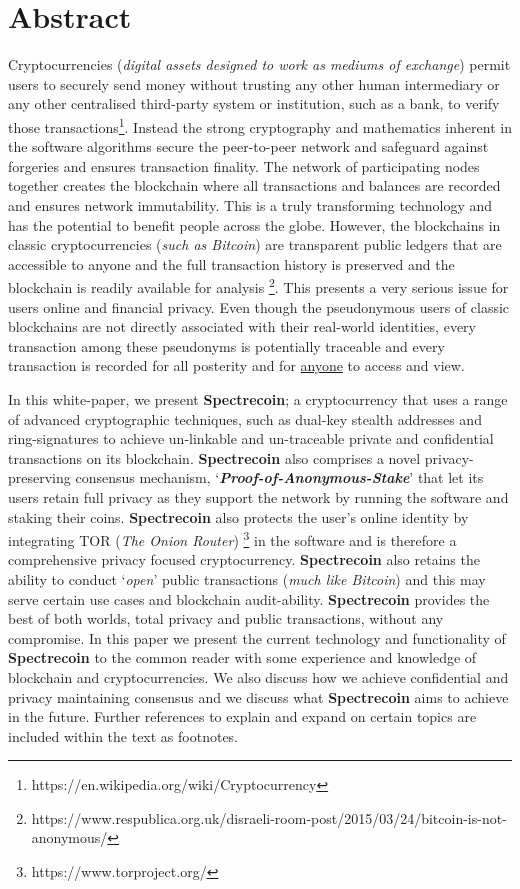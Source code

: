 \section{Abstract}
Cryptocurrencies (\textit{digital assets designed to work as mediums of exchange})
permit users to securely send money without trusting any other human intermediary
or any other centralised third-party system or institution, such as a bank, to
verify those transactions\footnote{https://en.wikipedia.org/wiki/Cryptocurrency}.
Instead the strong cryptography and mathematics inherent in the software
algorithms secure the peer-to-peer network and safeguard against forgeries and
ensures transaction finality. The network of participating nodes together
creates the blockchain where all transactions and balances are recorded and
ensures network immutability. This is a truly transforming technology and has
the potential to benefit people across the globe. However, the blockchains in
classic cryptocurrencies (\textit{such as Bitcoin}) are transparent public
ledgers that are accessible to anyone and the full transaction history is
preserved and the blockchain is readily available for analysis
\footnote{https://www.respublica.org.uk/disraeli-room-post/2015/03/24/bitcoin-is-not-anonymous/}.
This presents a very serious issue for users online and financial privacy.
Even though the pseudonymous users of classic blockchains are not directly
associated with their real-world identities, every transaction among these
pseudonyms is potentially traceable and every transaction is recorded for
all posterity and for \underline{anyone} to access and view.

In this white-paper, we present \textbf{Spectrecoin}; a cryptocurrency that
uses a range of advanced cryptographic techniques, such as dual-key stealth
addresses and ring-signatures to achieve un-linkable and un-traceable
private and confidential transactions on its blockchain. \textbf{Spectrecoin}
also comprises a novel privacy-preserving consensus mechanism,
‘\textbf{\textit{Proof-of-Anonymous-Stake}}’ that let its users retain
full privacy as they support the network by running the software and
staking their coins. \textbf{Spectrecoin} also protects the user’s online
identity by integrating TOR (\textit{The Onion Router})
\footnote{https://www.torproject.org/} in the software and is therefore a
comprehensive privacy focused cryptocurrency. \textbf{Spectrecoin} also
retains the ability to conduct ‘\textit{open}’ public transactions
(\textit{much like Bitcoin}) and this may serve certain use cases and
blockchain audit-ability. \textbf{Spectrecoin} provides the best of both
worlds, total privacy and public transactions, without any compromise.
In this paper we present the current technology and functionality of
\textbf{Spectrecoin} to the common reader with some experience and knowledge
of blockchain and cryptocurrencies. We also discuss how we achieve
confidential and privacy maintaining consensus and we discuss what
\textbf{Spectrecoin} aims to achieve in the future. Further references
to explain and expand on certain topics are included within the text as
footnotes.
